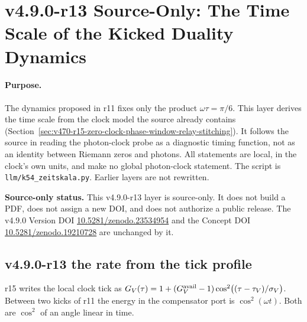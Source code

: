 \clearpage
\section*{v4.9.0-r13 Source-Only: The Time Scale of the Kicked Duality Dynamics}
\label{sec:v490-r13-time-scale}

\paragraph{Purpose.}
The dynamics proposed in r11 fixes only the product \(\omega\tau=\pi/6\).  This layer derives the time scale from the clock
model the source already contains (Section~\ref{sec:v470-r15-zero-clock-phase-window-relay-stitching}).  It follows the
source in reading the photon-clock probe as a diagnostic timing function, not as an identity between Riemann zeros and
photons.  All statements are local, in the clock's own units, and make no global photon-clock statement.  The script is
\texttt{llm/k54\_zeitskala.py}.  Earlier layers are not rewritten.

\noindent\textbf{Source-only status.}
This v4.9.0-r13 layer is source-only.  It does not build a PDF, does not assign a new DOI,
and does not authorize a public release.  The v4.9.0 Version DOI
\href{https://doi.org/10.5281/zenodo.23534954}{10.5281/zenodo.23534954} and the Concept DOI
\href{https://doi.org/10.5281/zenodo.19210728}{10.5281/zenodo.19210728} are unchanged by it.

\subsection*{v4.9.0-r13 the rate from the tick profile}
\label{subsec:v490-r13-rate}

r15 writes the local clock tick as \(G_V(\tau)=1+(G_V^{\rm avail}-1)\cos^2\bigl((\tau-\tau_V)/\sigma_V\bigr)\).  Between two kicks of
r11 the energy in the compensator port is \(\cos^2(\omega t)\).  Both are \(\cos^2\) of an angle linear in time.

